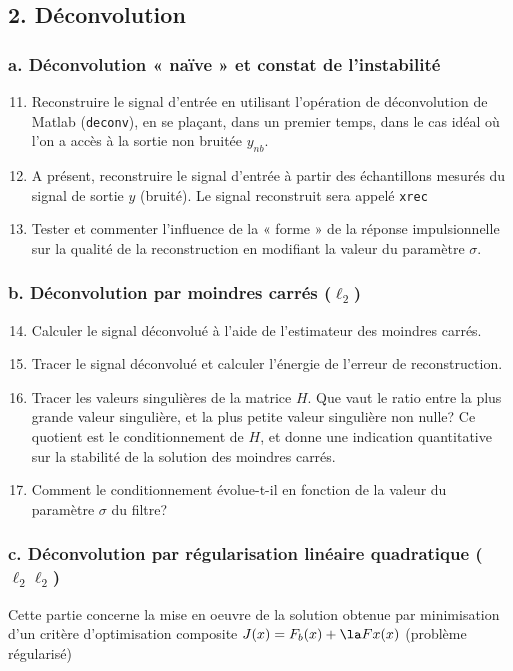 \documentclass{article}
\begin{document}
\subsection*{2. Déconvolution}
\subsubsection*{a. Déconvolution « naïve » et constat de l’instabilité}
\begin{enumerate}
	\setcounter{enumi}{10}
	\item Reconstruire le signal d’entrée en utilisant l’opération de déconvolution de Matlab (\texttt{deconv}), en se plaçant, dans un premier temps, dans le cas idéal où l’on a accès à la sortie non bruitée $y_{nb}$.
	\item A présent, reconstruire le signal d’entrée à partir des échantillons mesurés du signal de sortie $y$ (bruité). Le signal reconstruit sera appelé \texttt{xrec}
	\item Tester et commenter l’influence de la « forme » de la réponse impulsionnelle sur la qualité de la reconstruction en modifiant la valeur du paramètre $\sigma$.
	\end{enumerate}
	
\subsubsection*{b. Déconvolution par moindres carrés ($\ell_2$)}
\begin{enumerate}
	\setcounter{enumi}{13}
	\item Calculer le signal déconvolué à l’aide de l’estimateur des moindres carrés.
	\item Tracer le signal déconvolué et calculer l’énergie de l’erreur de reconstruction.
	\item Tracer les valeurs singulières de la matrice $H$. Que vaut le ratio entre la plus grande valeur singulière, et la plus petite valeur singulière non nulle? Ce quotient est le \guillemotleft conditionnement \guillemotright de $H$, et donne une indication quantitative sur la stabilité de la solution des moindres carrés.
	\item Comment le conditionnement évolue-t-il en fonction de la valeur du paramètre $\sigma$ du filtre?
\end{enumerate}

\subsubsection*{c. Déconvolution par régularisation linéaire quadratique ($\ell_2\ell_2$)}
Cette partie concerne la mise en oeuvre de la solution obtenue par minimisation d'un critère d'optimisation composite $J(x) = F_b(x) + \la Fx(x)$ (problème régularisé)
\end{document}
